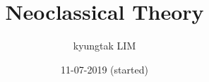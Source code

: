 \documentclass[a4paper, 12pt]{report}
\title{Neoclassical Theory}
\author{kyungtak LIM }
\date{11-07-2019 (started)}
\begin{document}
\dominitoc
\tableofcontents
%



\newpage
\appendix
\medskip




%
\end{document}
